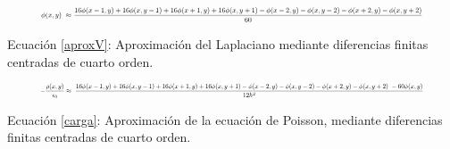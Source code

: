 
\begin{equation}
	\label{aproxV}
	\resizebox{.9\columnwidth }{!}{
		${ \textstyle \phi(x,y)\ \approx\ } {\displaystyle \frac{16 \phi(x - 1,y) + 16 \phi(x,y - 1) + 16 \phi(x + 1,y) + 16 \phi(x,y + 1)
						- \phi(x - 2,y) -  \phi(x,y - 2) - \phi(x + 2,y) - \phi(x,y + 2)}{60}}$
	}
\end{equation}

{\fontsize{8}{7}\selectfont Ecuación \ref{aproxV}: Aproximación del Laplaciano mediante diferencias finitas centradas de cuarto orden. }

\vspace{\baselineskip}

\begin{equation}
	\label{carga}
    \resizebox{.9\columnwidth }{!}{
		${\displaystyle -\frac{\rho(x,y)}{\epsilon_0} \approx\ \frac{16 \phi(x - 1,y) + 16 \phi(x,y - 1) + 16 \phi(x + 1,y) + 16 \phi(x,y + 1)
        - \phi(x - 2,y) -  \phi(x,y - 2) - \phi(x + 2,y) - \phi(x,y + 2)\ - 60\phi(x,y)}{12h^{2}}}$
    }
\end{equation}

{\fontsize{8}{7}\selectfont Ecuación \ref{carga}: Aproximación de la ecuación de Poisson, mediante diferencias finitas centradas de cuarto orden.}

